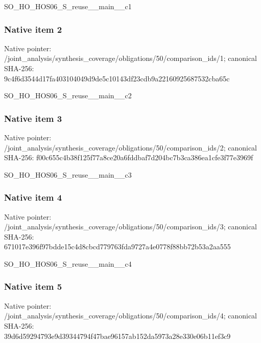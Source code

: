 \documentclass[10pt,a4paper]{article}
\begin{document}
\begingroup\raggedright\sloppy SO\_\allowbreak{}HO\_\allowbreak{}HOS06\_\allowbreak{}S\_\allowbreak{}reuse\_\allowbreak{}\_\allowbreak{}main\_\allowbreak{}\_\allowbreak{}c1\par\endgroup

\subsubsection{Native item 2}
Native pointer: /joint\_\allowbreak{}analysis/synthesis\_\allowbreak{}coverage/obligations/50/comparison\_\allowbreak{}ids/1; canonical SHA-256: 9c4f6d3544d17fa403104049d9de5c10143df23cdb9a22160925687532cba65c

\begingroup\raggedright\sloppy SO\_\allowbreak{}HO\_\allowbreak{}HOS06\_\allowbreak{}S\_\allowbreak{}reuse\_\allowbreak{}\_\allowbreak{}main\_\allowbreak{}\_\allowbreak{}c2\par\endgroup

\subsubsection{Native item 3}
Native pointer: /joint\_\allowbreak{}analysis/synthesis\_\allowbreak{}coverage/obligations/50/comparison\_\allowbreak{}ids/2; canonical SHA-256: f00c655c4b38f125f77a8ce20a6fddbaf7d204bc7b3ca386ea1cfe3f77e3969f

\begingroup\raggedright\sloppy SO\_\allowbreak{}HO\_\allowbreak{}HOS06\_\allowbreak{}S\_\allowbreak{}reuse\_\allowbreak{}\_\allowbreak{}main\_\allowbreak{}\_\allowbreak{}c3\par\endgroup

\subsubsection{Native item 4}
Native pointer: /joint\_\allowbreak{}analysis/synthesis\_\allowbreak{}coverage/obligations/50/comparison\_\allowbreak{}ids/3; canonical SHA-256: 671017e396f97bdde15c4d8cbcd779763fda9727a4e0778f88bb72b53a2aa555

\begingroup\raggedright\sloppy SO\_\allowbreak{}HO\_\allowbreak{}HOS06\_\allowbreak{}S\_\allowbreak{}reuse\_\allowbreak{}\_\allowbreak{}main\_\allowbreak{}\_\allowbreak{}c4\par\endgroup

\subsubsection{Native item 5}
Native pointer: /joint\_\allowbreak{}analysis/synthesis\_\allowbreak{}coverage/obligations/50/comparison\_\allowbreak{}ids/4; canonical SHA-256: 39d6d59294793e9d39344794f47bae96157ab152da5973a28e330e06b11ef3c9
\end{document}
